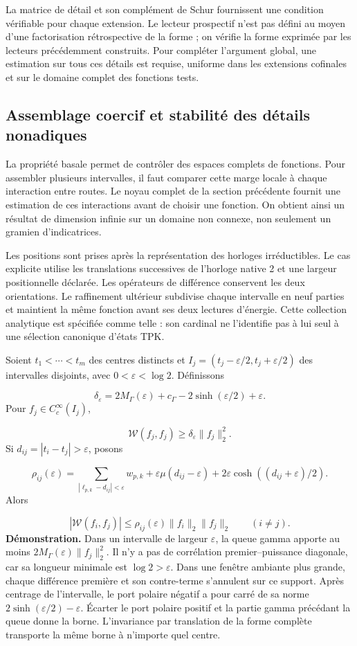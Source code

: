 La matrice de détail et son complément de Schur fournissent une condition vérifiable pour chaque extension. Le lecteur prospectif n'est pas défini au moyen d'une factorisation rétrospective de la forme ; on vérifie la forme exprimée par les lecteurs précédemment construits. Pour compléter l'argument global, une estimation sur tous ces détails est requise, uniforme dans les extensions cofinales et sur le domaine complet des fonctions tests.

\subsection{Assemblage coercif et stabilité des détails nonadiques}
\label{rz:ensamblaje}
La propriété basale permet de contrôler des espaces complets de fonctions. Pour assembler plusieurs intervalles, il faut comparer cette marge locale à chaque interaction entre routes. Le noyau complet de la section précédente fournit une estimation de ces interactions avant de choisir une fonction. On obtient ainsi un résultat de dimension infinie sur un domaine non connexe, non seulement un gramien d’indicatrices.

Les positions sont prises après la représentation des horloges irréductibles. Le cas explicite utilise les translations successives de l'horloge native 2 et une largeur positionnelle déclarée. Les opérateurs de différence conservent les deux orientations. Le raffinement ultérieur subdivise chaque intervalle en neuf parties et maintient la même fonction avant ses deux lectures d'énergie. Cette collection analytique est spécifiée comme telle : son cardinal ne l'identifie pas à lui seul à une sélection canonique d'états TPK.

Soient \(t_1<\cdots<t_m\) des centres distincts et \(I_j=(t_j-\varepsilon/2,t_j+\varepsilon/2)\) des intervalles disjoints, avec \(0<\varepsilon<\log2\). Définissons

\[
\delta_\varepsilon=2M_\Gamma(\varepsilon)+c_\Gamma
-2\sinh(\varepsilon/2)+\varepsilon.
\]
Pour \(f_j\in C_c^\infty(I_j)\),

\[
\mathscr W(f_j,f_j)\geq\delta_\varepsilon\|f_j\|_2^2.
\]
Si \(d_{ij}=|t_i-t_j|>\varepsilon\), posons

\[
\rho_{ij}(\varepsilon)=
\sum_{|\ell_{p,k}-d_{ij}|<\varepsilon}w_{p,k}
+\varepsilon\mu(d_{ij}-\varepsilon)
+2\varepsilon\cosh((d_{ij}+\varepsilon)/2).
\]
Alors

\[
|\mathscr W(f_i,f_j)|
\leq\rho_{ij}(\varepsilon)\|f_i\|_2\|f_j\|_2
\qquad(i\neq j).
\]
\textbf{Démonstration.} Dans un intervalle de largeur \(\varepsilon\), la queue gamma apporte au moins \(2M_\Gamma(\varepsilon)\|f_j\|_2^2\). Il n'y a pas de corrélation premier–puissance diagonale, car sa longueur minimale est \(\log2>\varepsilon\). Dans une fenêtre ambiante plus grande, chaque différence première et son contre-terme s'annulent sur ce support. Après centrage de l'intervalle, le port polaire négatif a pour carré de sa norme \(2\sinh(\varepsilon/2)-\varepsilon\). Écarter le port polaire positif et la partie gamma précédant la queue donne la borne. L'invariance par translation de la forme complète transporte la même borne à n'importe quel centre.


